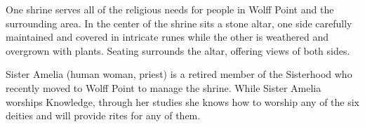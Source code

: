 One shrine serves all of the religious needs for people in Wolff Point and the surrounding area.
In the center of the shrine sits a stone altar, one side carefully maintained and covered in intricate runes while the other is weathered and overgrown with plants.
Seating surrounds the altar, offering views of both sides.

Sister Amelia (human woman, priest) is a retired member of the Sisterhood who recently moved to Wolff Point to manage the shrine.
While Sister Amelia worships Knowledge, through her studies she knows how to worship any of the six deities and will provide rites for any of them.
